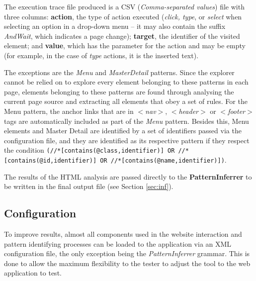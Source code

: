 \documentclass[10pt, conference, compsocconf]{IEEEtran}
\begin{document}
The execution trace file produced is a CSV (\textit{Comma-separated values}) file with three columns: \textbf{action}, the type of action executed (\textit{click, type}, or \textit{select} when selecting an option in a drop-down menu -- it may also contain the suffix \textit{AndWait}, which indicates a page change); \textbf{target}, the identifier of the visited element; and \textbf{value}, which has the parameter for the action and may be empty (for example, in the case of \textit{type} actions, it is the inserted text).

The exceptions are the \textit{Menu} and \textit{MasterDetail} patterns. Since the explorer cannot be relied on to explore every element belonging to these patterns in each page, elements belonging to these patterns are found through analysing the current page source and extracting all elements that obey a set of rules. For the Menu pattern, the anchor links that are in \textit{$<$nav$>$}, \textit{$<$header$>$} or \textit{$<$footer$>$} tags are automatically included as part of the \textit{Menu} pattern. Besides this, Menu elements and Master Detail are identified by a set of identifiers passed via the configuration file, and they are identified as its respective pattern if they respect the condition \texttt{(//*[contains(@class,identifier)] OR //*[contains(@id,identifier)] OR //*[contains(@name,identifier)])}.

The results of the HTML analysis are passed directly to the \textbf{PatternInferrer} to be written in the final output file (see Section \ref{sec:inf}).

\subsection{Configuration}\label{sec:conf}
To improve results, almost all components used in the website interaction and pattern identifying processes can be loaded to the application via an XML configuration file, the only exception being the \textit{PatternInferrer} grammar. This is done to allow the maximum flexibility to the tester to adjust the tool to the web application to test.
\end{document}
